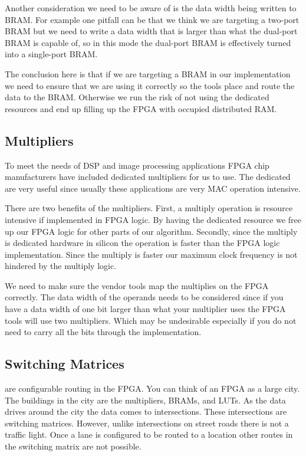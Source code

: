 Another consideration we need to be aware of is the data width being written to \ac{BRAM}. For example one pitfall can be that we think we are targeting a two-port \ac{BRAM} but we need to write a data width that is larger than what the dual-port \ac{BRAM} is capable of, so in this mode the dual-port \ac{BRAM} is effectively turned into a single-port \ac{BRAM}. 

The conclusion here is that if we are targeting a \ac{BRAM} in our implementation we need to ensure that we are using it correctly so the tools place and route the data to the \ac{BRAM}. Otherwise we run the risk of not using the dedicated resources and end up filling up the \ac{FPGA} with occupied distributed \ac{RAM}.

\subsection{Multipliers}

To meet the needs of \ac{DSP} and image processing applications \ac{FPGA} chip manufacturers have included dedicated multipliers for us to use. The dedicated  are very useful since usually these applications are very \ac{MAC} operation intensive. 

There are two benefits of the multipliers. First, a multiply operation is resource intensive if implemented in \ac{FPGA} logic. By having the dedicated resource we free up our \ac{FPGA} logic for other parts of our algorithm. Secondly, since the multiply is dedicated hardware in silicon the operation is faster than the \ac{FPGA} logic implementation. Since the multiply is faster our maximum clock frequency is not hindered by the multiply logic. 
	
We need to make sure the vendor tools map the multiplies on the \ac{FPGA} correctly. The data width of the operands needs to be considered since if you have a data width of one bit larger than what your multiplier uses the \ac{FPGA} tools will use two multipliers. Which may be undesirable especially if you do not need to carry all the bits through the implementation. 

\subsection{Switching Matrices}

 are configurable routing	in the \ac{FPGA}. You can think of an \ac{FPGA} as a large city. The buildings in the city are the multipliers, \ac{BRAM}s, and \ac{LUT}s. As the data drives around the city the data comes to intersections. These intersections are switching matrices. However, unlike intersections on street roads there is not a traffic light. Once a lane is configured to be routed to a location other routes in the switching matrix are not possible.

